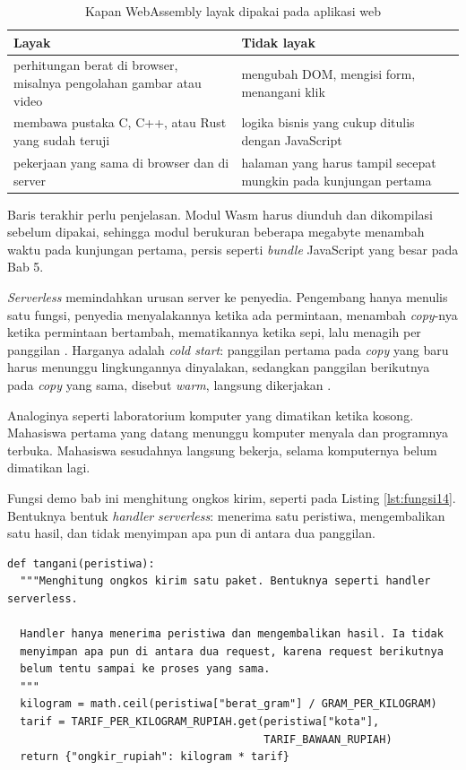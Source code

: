 \begin{table}[!htb]
  \centering
  \caption{Kapan WebAssembly layak dipakai pada aplikasi web}
  \label{tab:wasm14}
  \begin{tabularx}{\textwidth}{XX}
    \hline
    \textbf{Layak} & \textbf{Tidak layak} \\
    \hline
    perhitungan berat di browser, misalnya pengolahan gambar atau video & mengubah DOM, mengisi form, menangani klik \\
    \hline
    membawa pustaka C, C++, atau Rust yang sudah teruji & logika bisnis yang cukup ditulis dengan JavaScript \\
    \hline
    pekerjaan yang sama di browser dan di server & halaman yang harus tampil secepat mungkin pada kunjungan pertama \\
    \hline
  \end{tabularx}
\end{table}

Baris terakhir perlu penjelasan. Modul Wasm harus diunduh dan dikompilasi
sebelum dipakai, sehingga modul berukuran beberapa megabyte menambah waktu
pada kunjungan pertama, persis seperti \textit{bundle} JavaScript yang besar
pada Bab 5.

\textit{Serverless} memindahkan urusan server ke penyedia. Pengembang hanya
menulis satu fungsi, penyedia menyalakannya ketika ada permintaan,
menambah \textit{copy}-nya ketika permintaan bertambah, mematikannya ketika sepi,
lalu menagih per panggilan \cite{jonas2019serverless}. Harganya adalah
\textit{cold start}: panggilan pertama pada \textit{copy} yang baru harus
menunggu lingkungannya dinyalakan, sedangkan panggilan berikutnya pada
\textit{copy} yang sama, disebut \textit{warm}, langsung dikerjakan
\cite{aws-lambda-lifecycle}.

Analoginya seperti laboratorium komputer yang dimatikan ketika kosong.
Mahasiswa pertama yang datang menunggu komputer menyala dan programnya
terbuka. Mahasiswa sesudahnya langsung bekerja, selama komputernya belum
dimatikan lagi.

Fungsi demo bab ini menghitung ongkos kirim, seperti pada Listing
\ref{lst:fungsi14}. Bentuknya bentuk \textit{handler} \textit{serverless}:
menerima satu peristiwa, mengembalikan satu hasil, dan tidak menyimpan apa
pun di antara dua panggilan.

\begin{lstlisting}[style=PythonStyle, caption={Satu \textit{handler} tanpa \textit{state}, tersedia di \berkas{sources/chapter14/fungsi.py}}, label={lst:fungsi14}]
def tangani(peristiwa):
  """Menghitung ongkos kirim satu paket. Bentuknya seperti handler serverless.

  Handler hanya menerima peristiwa dan mengembalikan hasil. Ia tidak
  menyimpan apa pun di antara dua request, karena request berikutnya
  belum tentu sampai ke proses yang sama.
  """
  kilogram = math.ceil(peristiwa["berat_gram"] / GRAM_PER_KILOGRAM)
  tarif = TARIF_PER_KILOGRAM_RUPIAH.get(peristiwa["kota"],
                                        TARIF_BAWAAN_RUPIAH)
  return {"ongkir_rupiah": kilogram * tarif}
\end{lstlisting}

